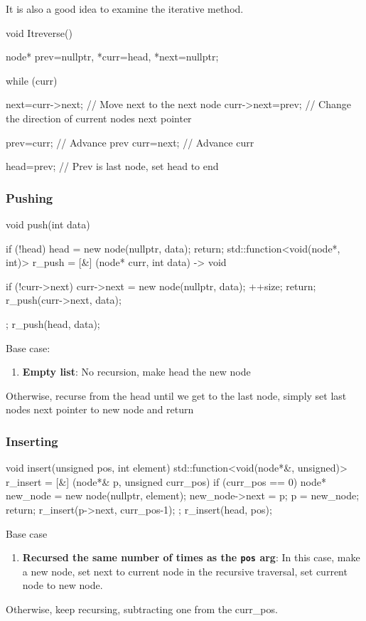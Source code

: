 \documentclass{report}
\begin{document}
\bigbreak \noindent 
It is also a good idea to examine the iterative method.
\bigbreak \noindent 
\begin{cppcode}
    void Itreverse() {
        node* prev=nullptr, *curr=head, *next=nullptr;

        while (curr) {
            next=curr->next; // Move next to the next node
            curr->next=prev; // Change the direction of current nodes next pointer

            prev=curr; // Advance prev
            curr=next; // Advance curr
        }
        head=prev; // Prev is last node, set head to end
    }
\end{cppcode}

\pagebreak 
\subsubsection{Pushing}
\bigbreak \noindent 
\begin{cppcode}
    void push(int data) {
        if (!head) {
            head = new node(nullptr, data);
            return;
        }
        std::function<void(node*, int)> r_push = [&] (node* curr, int data) -> void {

            if (!curr->next) {
                curr->next = new node(nullptr, data);
                ++size;
                return;
            }
            r_push(curr->next, data);
        };
        r_push(head, data);
    }
\end{cppcode}
\bigbreak \noindent 
Base case:
\begin{enumerate}
    \item \textbf{Empty list}: No recursion, make head the new node
\end{enumerate}
\bigbreak \noindent 
Otherwise, recurse from the head until we get to the last node, simply set last nodes next pointer to new node and return

\pagebreak 
\subsubsection{Inserting}
\bigbreak \noindent 
\begin{cppcode}
    void insert(unsigned pos, int element) {
        std::function<void(node*&, unsigned)> r_insert = [&] (node*& p, unsigned curr_pos) {
            if (curr_pos == 0) {
                node* new_node = new node(nullptr, element);
                new_node->next = p;
                p = new_node;
                return;
            }
            r_insert(p->next,  curr_pos-1);
        };
        r_insert(head, pos);
    }
\end{cppcode}
\bigbreak \noindent 
Base case
\begin{enumerate}
    \item \textbf{Recursed the same number of times as the \texttt{pos} arg}: In this case, make a new node, set next to current node in the recursive traversal, set current node to new node.
\end{enumerate}
\bigbreak \noindent 
Otherwise, keep recursing, subtracting one from the curr\_pos.
\end{document}
